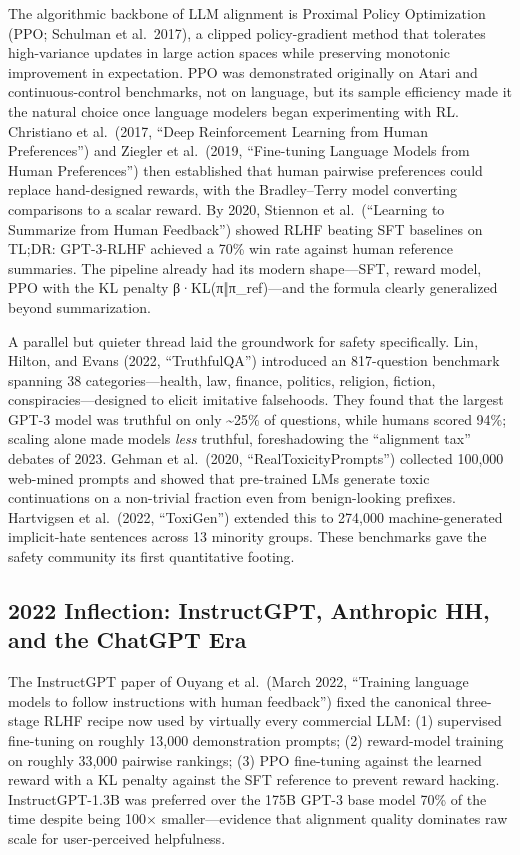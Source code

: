 \documentclass{article}
\begin{document}
The algorithmic backbone of LLM alignment is Proximal Policy Optimization (PPO; Schulman et al.~2017), a clipped policy-gradient method that tolerates high-variance updates in large action spaces while preserving monotonic improvement in expectation. PPO was demonstrated originally on Atari and continuous-control benchmarks, not on language, but its sample efficiency made it the natural choice once language modelers began experimenting with RL. Christiano et al.~(2017, ``Deep Reinforcement Learning from Human Preferences'') and Ziegler et al.~(2019, ``Fine-tuning Language Models from Human Preferences'') then established that human pairwise preferences could replace hand-designed rewards, with the Bradley--Terry model converting comparisons to a scalar reward. By 2020, Stiennon et al.~(``Learning to Summarize from Human Feedback'') showed RLHF beating SFT baselines on TL;DR: GPT-3-RLHF achieved a 70\% win rate against human reference summaries. The pipeline already had its modern shape---SFT, reward model, PPO with the KL penalty β·KL(π‖π\_ref)---and the formula clearly generalized beyond summarization.

A parallel but quieter thread laid the groundwork for safety specifically. Lin, Hilton, and Evans (2022, ``TruthfulQA'') introduced an 817-question benchmark spanning 38 categories---health, law, finance, politics, religion, fiction, conspiracies---designed to elicit imitative falsehoods. They found that the largest GPT-3 model was truthful on only \textasciitilde25\% of questions, while humans scored 94\%; scaling alone made models \emph{less} truthful, foreshadowing the ``alignment tax'' debates of 2023. Gehman et al.~(2020, ``RealToxicityPrompts'') collected 100,000 web-mined prompts and showed that pre-trained LMs generate toxic continuations on a non-trivial fraction even from benign-looking prefixes. Hartvigsen et al.~(2022, ``ToxiGen'') extended this to 274,000 machine-generated implicit-hate sentences across 13 minority groups. These benchmarks gave the safety community its first quantitative footing.

\subsection{2022 Inflection: InstructGPT, Anthropic HH, and the ChatGPT Era}\label{inflection-instructgpt-anthropic-hh-and-the-chatgpt-era}

The InstructGPT paper of Ouyang et al.~(March 2022, ``Training language models to follow instructions with human feedback'') fixed the canonical three-stage RLHF recipe now used by virtually every commercial LLM: (1) supervised fine-tuning on roughly 13,000 demonstration prompts; (2) reward-model training on roughly 33,000 pairwise rankings; (3) PPO fine-tuning against the learned reward with a KL penalty against the SFT reference to prevent reward hacking. InstructGPT-1.3B was preferred over the 175B GPT-3 base model 70\% of the time despite being 100× smaller---evidence that alignment quality dominates raw scale for user-perceived helpfulness.
\end{document}
